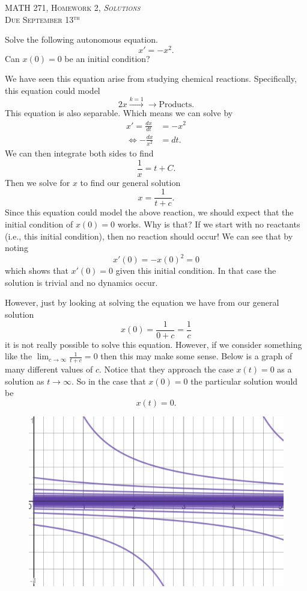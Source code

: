 \documentclass[12pt]{article} %
\begin{document}
\begin{center}
   \textsc{\large MATH 271, Homework 2, \emph{Solutions}}\\
   \textsc{Due September 13$^\textrm{th}$}
\end{center}
\vspace{.5cm}

\begin{problem}
    Solve the following autonomous equation.
    \[
    x'=-x^2.
    \]
    Can $x(0)=0$ be an initial condition?
\end{problem}
\begin{solution}
We have seen this equation arise from studying chemical reactions.  Specifically, this equation could model
\[
2x \xrightarrow{k=1} \to \textrm{Products}.
\]
This equation is also separable.  Which means we can solve by
\begin{align*}
    x'=\frac{dx}{dt}&=-x^2\\
    \iff -\frac{dx}{x^2}&=dt.
\end{align*}
We can then integrate both sides to find
\[
\frac{1}{x}=t+C.
\]
Then we solve for $x$ to find our general solution
\[
\boxed{x=\frac{1}{t+c}.}
\]
Since this equation could model the above reaction, we should expect that the initial condition of $x(0)=0$ works. Why is that? If we start with no reactants (i.e., this initial condition), then no reaction should occur!  We can see that by noting
\[
x'(0)=-x(0)^2=0
\]
which shows that $x'(0)=0$ given this initial condition.  In that case the solution is trivial and no dynamics occur.

However, just by looking at solving the equation we have from our general solution
\[
x(0)=\frac{1}{0+c}=\frac{1}{c}
\]
it is not really possible to solve this equation. However, if we consider something like the $\lim_{c\to \infty} \frac{1}{t+c}=0$ then this may make some sense.  Below is a graph of many different values of $c$. Notice that they approach the case $x(t)=0$ as a solution as $t\to \infty$. So in the case that $x(0)=0$ the particular solution would be
\[
\boxed{x(t)=0.}
\]
\begin{figure}[H]
    \centering
    \includegraphics[width=\textwidth]{2nd_order_chem.png}
\end{figure}
\end{solution}
\end{document}
